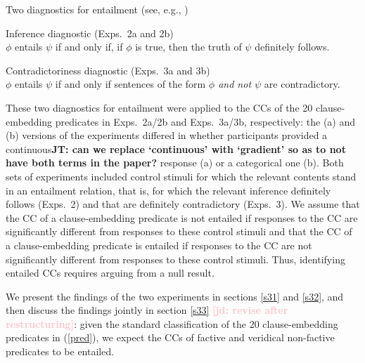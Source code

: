 \documentclass[11pt,fleqn]{article}
\newcommand{\jd}[1]{\textbf{\textcolor{Pink}{[jd: #1]}}}
\newcommand{\6}{\mbox{$[\hspace*{-.6mm}[$}}
\newcommand{\9}{\mbox{$]\hspace*{-.6mm}]$}}
\newcommand{\jt}[1]{\textbf{\color{blue}JT: #1}}
\begin{document}
\begin{exe}
\ex\label{diag} Two diagnostics for entailment \hfill (see, e.g., \citealt[\S3.1]{ccmg90})
\begin{xlist}
\ex  Inference diagnostic (Exps.~2a and 2b)\\ $\phi$ entails $\psi$ if and only if, if $\phi$ is true, then the truth of $\psi$ definitely follows. 

\ex  Contradictoriness diagnostic  (Exps.~3a and 3b)\\ $\phi$ entails $\psi$ if and only if sentences of the form {\em $\phi$ and not $\psi$} are contradictory. 

\end{xlist}
\end{exe}
These two diagnostics for entailment were applied to the CCs of the 20 clause-embedding predicates in Exps.~2a/2b and Exps.~3a/3b, respectively: the (a) and (b) versions of the experiments differed in whether participants provided a continuous\jt{can we replace `continuous' with `gradient' so as to not have both terms in the paper?} response (a) or a categorical one (b).  Both sets of experiments included control stimuli for which the relevant contents stand in an entailment relation, that is, for which the relevant inference definitely follows (Exps.~2) and that are definitely contradictory (Exps.~3). We assume that the CC of a clause-embedding predicate is not entailed if responses to the CC are significantly different from responses to these control stimuli and that the CC of a clause-embedding predicate is entailed if responses to the CC are not significantly different from responses to these control stimuli. Thus, identifying entailed CCs  requires arguing from a null result. 

We present the findings of the two experiments in sections \ref{s31} and \ref{s32}, and then discuss the findings jointly in section \ref{s33} \jd{revise after restructuring}: given the standard classification of the 20 clause-embedding predicates in (\ref{pred}), we expect the CCs of factive and veridical non-factive predicates to be entailed.

\end{document}
